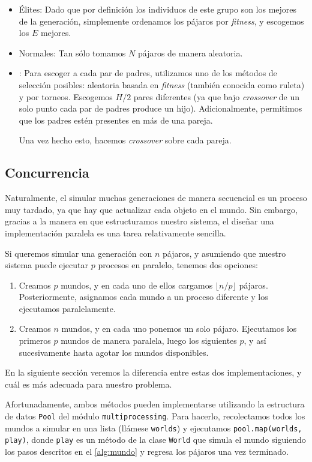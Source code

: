 \documentclass[twocolumn,spanish]{revtex4-1}
\begin{document}
\begin{itemize}
    \item Élites: Dado que por definición los individuos de este grupo son los mejores de la generación, simplemente ordenamos los pájaros por \textit{fitness}, y escogemos los $E$ mejores.
    \item Normales: Tan sólo tomamos $N$ pájaros de manera aleatoria.
    \item: Para escoger a cada par de padres, utilizamos uno de los métodos de selección posibles: aleatoria basada en \textit{fitness} (también conocida como ruleta) y por torneos. Escogemos $H/2$ pares diferentes (ya que bajo \textit{crossover} de un solo punto cada par de padres produce un hijo). Adicionalmente, permitimos que los padres estén presentes en más de una pareja.

    Una vez hecho esto, hacemos \textit{crossover} sobre cada pareja.

\end{itemize}

\subsection{Concurrencia}\label{sec:concurrencia}
Naturalmente, el simular muchas generaciones de manera secuencial es un proceso muy tardado, ya que hay que actualizar cada objeto en el mundo. Sin embargo, gracias a la manera en que estructuramos nuestro sistema, el diseñar una implementación paralela es una tarea relativamente sencilla.

Si queremos simular una generación con $n$ pájaros, y asumiendo que nuestro sistema puede ejecutar $p$ procesos en paralelo, tenemos dos opciones:
\begin{enumerate}
    \item Creamos $p$ mundos, y en cada uno de ellos cargamos $\lfloor n/p\rfloor$ pájaros. Posteriormente, asignamos cada mundo a un proceso diferente y los ejecutamos paralelamente.
    \item Creamos $n$ mundos, y en cada uno ponemos un solo pájaro. Ejecutamos los primeros $p$ mundos de manera paralela, luego los siguientes $p$, y así sucesivamente hasta agotar los mundos disponibles.
\end{enumerate}
En la siguiente sección veremos la diferencia entre estas dos implementaciones, y cuál es más adecuada para nuestro problema. 

Afortunadamente, ambos métodos pueden implementarse utilizando la estructura de datos \texttt{Pool} del módulo \texttt{multiprocessing}. Para hacerlo, recolectamos todos los mundos a simular en una lista (llámese \texttt{worlds}) y ejecutamos \texttt{pool.map(worlds, play)}, donde \texttt{play} es un método de la clase \texttt{World} que simula el mundo siguiendo los pasos descritos en el \cref{alg:mundo} y regresa los pájaros una vez terminado. 
\end{document}
